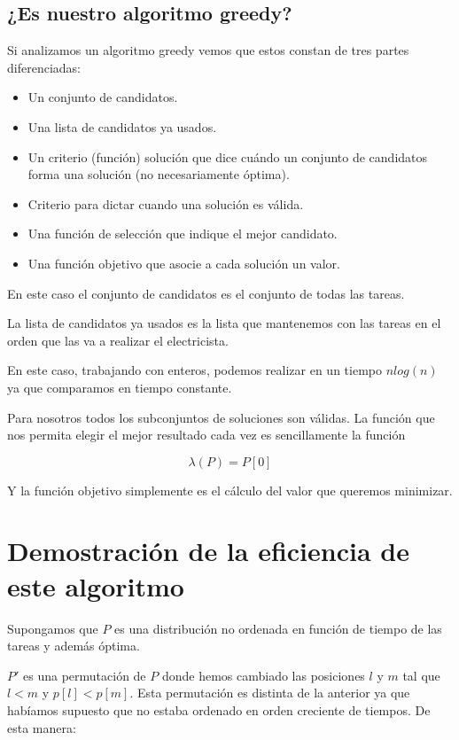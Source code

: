 \documentclass{article}
\begin{document}
\subsection{¿Es nuestro algoritmo greedy?}

Si analizamos un algoritmo greedy vemos que estos constan de tres
partes diferenciadas:

\begin{itemize}
\item Un conjunto de candidatos.
\item Una lista de candidatos ya usados.
\item Un criterio (función) solución que dice cuándo un conjunto de
  candidatos forma una solución (no necesariamente óptima).
\item Criterio para dictar cuando una solución es válida.
\item Una función de selección que indique el mejor candidato.
\item Una función objetivo que asocie a cada solución un valor.
\end{itemize}

En este caso el conjunto de candidatos es el conjunto de todas las
tareas.

La lista de candidatos ya usados es la lista que mantenemos con las
tareas en el orden que las va a realizar el electricista.

En este caso, trabajando con enteros, podemos realizar en un
tiempo $nlog(n)$ ya que comparamos en tiempo constante.

Para nosotros todos los subconjuntos de soluciones son válidas.  La
función que nos permita elegir el mejor resultado cada vez es
sencillamente la función

\[
  \lambda(P) = P[0]
\]

Y la función objetivo simplemente es el cálculo del valor que queremos
minimizar.

\section{Demostración de la eficiencia de este algoritmo}

Supongamos que $P$ es una distribución no ordenada en función de
tiempo de las tareas y además óptima.

$P'$ es una permutación de $P$ donde hemos cambiado las posiciones $l$
y $m$ tal que $l < m$ y $p[l] < p[m]$. Esta permutación es distinta de
la anterior ya que habíamos supuesto que no estaba ordenado en orden
creciente de tiempos. De esta manera:
\end{document}
